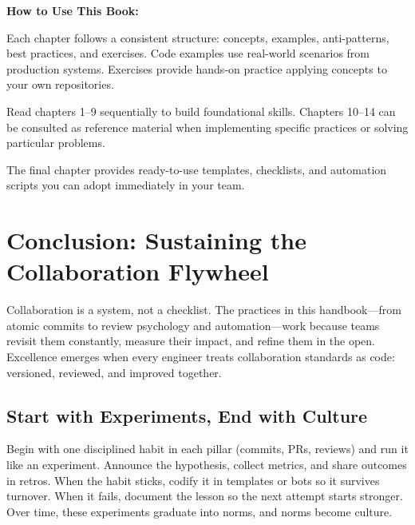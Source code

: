 \documentclass[11pt,openany]{book}
\begin{document}
\textbf{How to Use This Book:}

Each chapter follows a consistent structure: concepts, examples, anti-patterns, best practices, and exercises. Code examples use real-world scenarios from production systems. Exercises provide hands-on practice applying concepts to your own repositories.

Read chapters 1--9 sequentially to build foundational skills. Chapters 10--14 can be consulted as reference material when implementing specific practices or solving particular problems.

The final chapter provides ready-to-use templates, checklists, and automation scripts you can adopt immediately in your team.

\mainmatter
















\backmatter

\chapter*{Conclusion: Sustaining the Collaboration Flywheel}

Collaboration is a system, not a checklist. The practices in this handbook---from atomic commits to review psychology and automation---work because teams revisit them constantly, measure their impact, and refine them in the open. Excellence emerges when every engineer treats collaboration standards as code: versioned, reviewed, and improved together.

\section*{Start with Experiments, End with Culture}
Begin with one disciplined habit in each pillar (commits, PRs, reviews) and run it like an experiment. Announce the hypothesis, collect metrics, and share outcomes in retros. When the habit sticks, codify it in templates or bots so it survives turnover. When it fails, document the lesson so the next attempt starts stronger. Over time, these experiments graduate into norms, and norms become culture.
\end{document}
